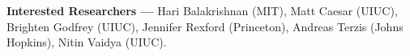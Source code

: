 \item \textbf{Interested Researchers ---} Hari Balakrishnan (MIT), Matt Caesar (UIUC), Brighten Godfrey (UIUC), Jennifer Rexford (Princeton), Andreas Terzis (Johns Hopkins), Nitin Vaidya (UIUC).
